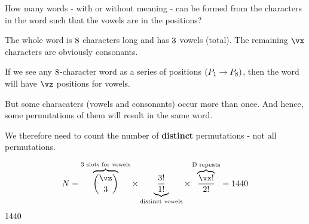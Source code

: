



\SUBTRACT\vc\vd\vx 
\DIVIDE{}\vy
\ifdefstring{}

\question[2] How many words - with or without meaning - can be formed from the characters in the word 
\va such that the vowels are in the \vb positions?

\watchout

\begin{solution}[\mcq]
	The whole word is $8$ characters long and has $3$ vowels (total). The remaining $\vx$ characters 
	are obviously consonants.

  If we see any $8$-character word as a series of positions $( P_1\to P_{8})$, then 
  the word will have $\vz$ \vb positions for vowels. 
	
  But some characaters (vowels and consonants) occur more than once. And hence, 
  some permutations of them will result in the same word. 

  We therefore need to count the number of \textbf{distinct} permutations - not all permutations.
	
  \[ N = \overbrace{\binom\vz\vd}^{\vd \text{ slots for vowels}}
        \times\underbrace{\dfrac{\vd !}{\vf}}_{\text{\vh}} 
        \times\overbrace{\dfrac{\vx !}{\vg}}^{\text{\vi}}  = \ve \]
\end{solution}

\ifprintanswers
  \begin{codex}
    $1440$
  \end{codex}
\fi

